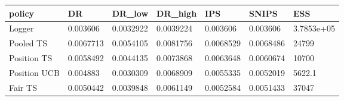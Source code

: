 \begin{tabular}{lllllll}
\hline
policy & DR & DR\_low & DR\_high & IPS & SNIPS & ESS \\
\hline
Logger & 0.003606 & 0.0032922 & 0.0039224 & 0.003606 & 0.003606 & 3.7853e+05 \\
Pooled TS & 0.0067713 & 0.0054105 & 0.0081756 & 0.0068529 & 0.0068486 & 24799 \\
Position TS & 0.0058492 & 0.0044135 & 0.0073868 & 0.0063648 & 0.0060674 & 10700 \\
Position UCB & 0.004883 & 0.0030309 & 0.0068909 & 0.0055335 & 0.0052019 & 5622.1 \\
Fair TS & 0.0050442 & 0.0039848 & 0.0061149 & 0.0052584 & 0.0051433 & 37047 \\
\hline
\end{tabular}